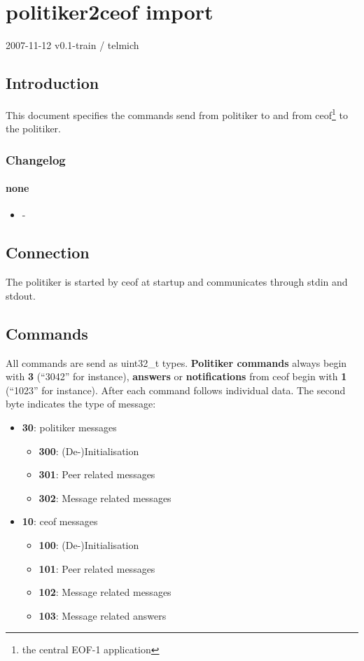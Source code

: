 \documentclass[12pt,a4paper]{book}
\begin{document}
\chapter{politiker2ceof import}

2007-11-12 v0.1-train / telmich

\section{Introduction}
This document specifies the commands send from politiker to and from
ceof\footnote{the central EOF-1 application} to the politiker.

\subsection{Changelog}
\subsubsection{none}
\begin{itemize}
\item -
\end{itemize}
\section{Connection}
The politiker is started by ceof at startup and communicates through stdin
and stdout.
\section{Commands}
All commands are send as uint32\_t types.
\textbf{Politiker commands} always begin with
\textbf{3} ("`3042"' for instance),
\textbf{answers} or \textbf{notifications} from
ceof begin with \textbf{1} ("`1023"' for instance).
After each command follows individual data. The second byte indicates the type of message:
\begin{itemize}
\item \textbf{30}: politiker messages
\begin{itemize}
\item \textbf{300}: (De-)Initialisation
\item \textbf{301}: Peer related messages
\item \textbf{302}: Message related messages
\end{itemize}
\item \textbf{10}: ceof messages
\begin{itemize}
\item \textbf{100}: (De-)Initialisation
\item \textbf{101}: Peer related messages
\item \textbf{102}: Message related messages
\item \textbf{103}: Message related answers
\end{itemize}
\end{itemize}
\end{document}
